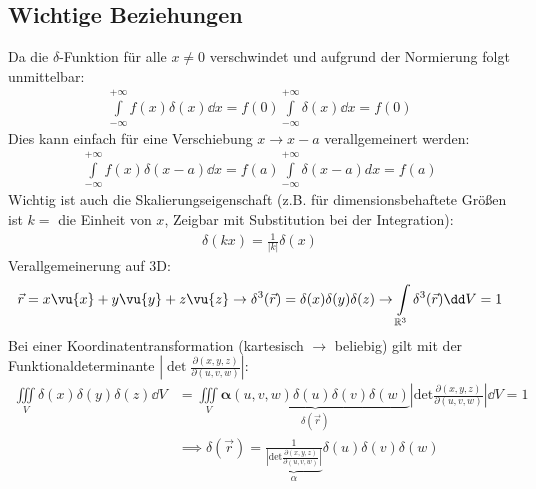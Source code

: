   \subsection{Wichtige Beziehungen}
	  Da die $\delta$-Funktion für alle $x\neq 0$ verschwindet und aufgrund der Normierung
	  folgt unmittelbar:
	  \begin{equation}
		  \begin{split}
			  \int\limits_{-\infty}^{+\infty}f(x) \delta(x) \dd x = f(0) \int\limits_{-\infty}
			  ^{+\infty}\delta(x) \dd x = f(0)
		  \end{split}
	  \end{equation}
	  Dies kann einfach für eine Verschiebung $x\to x-a$ verallgemeinert werden:
	  \begin{equation}
		  \begin{split}
			  \int\limits_{-\infty}^{+\infty}f(x) \delta(x-a) \dd x = f(a) \int\limits_{-\infty}
			  ^{+\infty}\delta(x-a) dx = f(a)
		  \end{split}
	  \end{equation}
	  Wichtig ist auch die Skalierungseigenschaft (z.B. für dimensionsbehaftete
	  Größen ist $k =$ die Einheit von $x$, Zeigbar mit Substitution bei der Integration):
	  \begin{equation}
		  \begin{split}
			  \delta(kx) = \frac{1}{|k|}\delta(x)
		  \end{split}
	  \end{equation}
	  Verallgemeinerung auf 3D:
	  \begin{equation}
		  \begin{split}
			  \vec{r}= x\vu{x}+y\vu{y}+z\vu{z}\to \delta^{3}(\vec{r})=\delta(x) \delta(y)
			  \delta(z) \to \int\limits_{\mathbb{R}^3}\delta^{3}(\vec{r}) \dd V = 1
		  \end{split}
	  \end{equation}
	  Bei einer Koordinatentransformation (kartesisch $\to$ beliebig) gilt mit der Funktionaldeterminante $\left|\det \frac{\partial (x,y,z)}{\partial (u,v,w)}\right|$:
	  \begin{equation}
	  	\begin{split}
	  	\iiint\limits_V \delta(x) \delta(y) \delta(z) \dd V &= \iiint\limits_V \underbrace{\bm{\alpha} (u,v,w)\delta(u) \delta(v) \delta(w)}_{\delta(\vec{r})} \left|\text{det} \frac{\partial (x,y,z)}{\partial (u,v,w)}\right| \dd V =1 \\ &\implies \delta(\vec{r}) = \underbrace{\frac{1}{\left|\text{det} \frac{\partial (x,y,z)}{\partial (u,v,w)}\right|}}_{\alpha}\delta(u) \delta(v) \delta(w)
	  	\end{split}
	  \end{equation}
